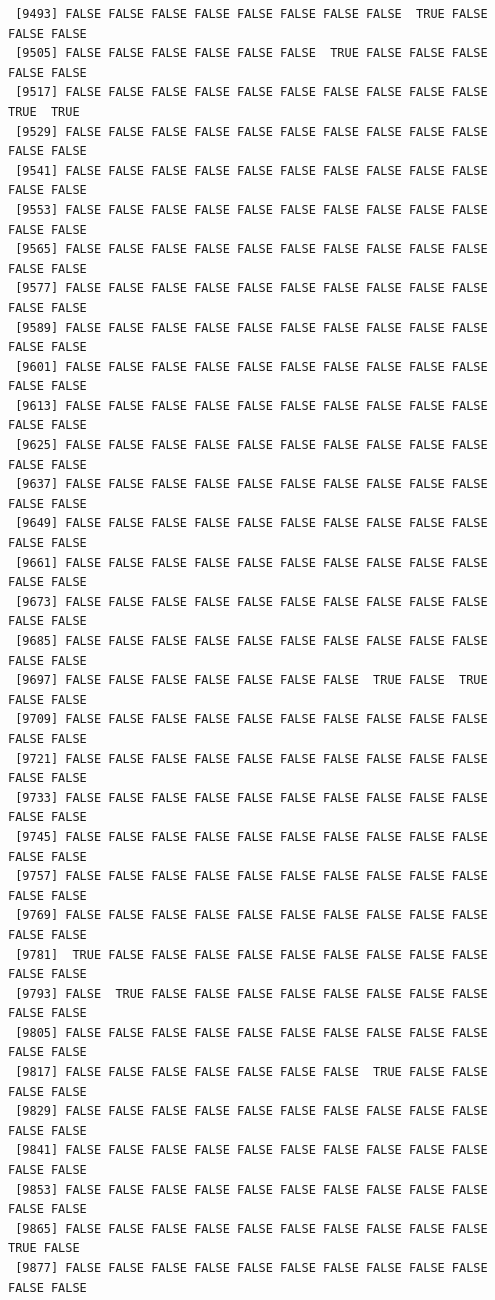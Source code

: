\documentclass[
  a4paper,
  DIV=11,
  numbers=noendperiod]{scrartcl}
\begin{document}
\begin{verbatim}
 [9493] FALSE FALSE FALSE FALSE FALSE FALSE FALSE FALSE  TRUE FALSE FALSE FALSE
 [9505] FALSE FALSE FALSE FALSE FALSE FALSE  TRUE FALSE FALSE FALSE FALSE FALSE
 [9517] FALSE FALSE FALSE FALSE FALSE FALSE FALSE FALSE FALSE FALSE  TRUE  TRUE
 [9529] FALSE FALSE FALSE FALSE FALSE FALSE FALSE FALSE FALSE FALSE FALSE FALSE
 [9541] FALSE FALSE FALSE FALSE FALSE FALSE FALSE FALSE FALSE FALSE FALSE FALSE
 [9553] FALSE FALSE FALSE FALSE FALSE FALSE FALSE FALSE FALSE FALSE FALSE FALSE
 [9565] FALSE FALSE FALSE FALSE FALSE FALSE FALSE FALSE FALSE FALSE FALSE FALSE
 [9577] FALSE FALSE FALSE FALSE FALSE FALSE FALSE FALSE FALSE FALSE FALSE FALSE
 [9589] FALSE FALSE FALSE FALSE FALSE FALSE FALSE FALSE FALSE FALSE FALSE FALSE
 [9601] FALSE FALSE FALSE FALSE FALSE FALSE FALSE FALSE FALSE FALSE FALSE FALSE
 [9613] FALSE FALSE FALSE FALSE FALSE FALSE FALSE FALSE FALSE FALSE FALSE FALSE
 [9625] FALSE FALSE FALSE FALSE FALSE FALSE FALSE FALSE FALSE FALSE FALSE FALSE
 [9637] FALSE FALSE FALSE FALSE FALSE FALSE FALSE FALSE FALSE FALSE FALSE FALSE
 [9649] FALSE FALSE FALSE FALSE FALSE FALSE FALSE FALSE FALSE FALSE FALSE FALSE
 [9661] FALSE FALSE FALSE FALSE FALSE FALSE FALSE FALSE FALSE FALSE FALSE FALSE
 [9673] FALSE FALSE FALSE FALSE FALSE FALSE FALSE FALSE FALSE FALSE FALSE FALSE
 [9685] FALSE FALSE FALSE FALSE FALSE FALSE FALSE FALSE FALSE FALSE FALSE FALSE
 [9697] FALSE FALSE FALSE FALSE FALSE FALSE FALSE  TRUE FALSE  TRUE FALSE FALSE
 [9709] FALSE FALSE FALSE FALSE FALSE FALSE FALSE FALSE FALSE FALSE FALSE FALSE
 [9721] FALSE FALSE FALSE FALSE FALSE FALSE FALSE FALSE FALSE FALSE FALSE FALSE
 [9733] FALSE FALSE FALSE FALSE FALSE FALSE FALSE FALSE FALSE FALSE FALSE FALSE
 [9745] FALSE FALSE FALSE FALSE FALSE FALSE FALSE FALSE FALSE FALSE FALSE FALSE
 [9757] FALSE FALSE FALSE FALSE FALSE FALSE FALSE FALSE FALSE FALSE FALSE FALSE
 [9769] FALSE FALSE FALSE FALSE FALSE FALSE FALSE FALSE FALSE FALSE FALSE FALSE
 [9781]  TRUE FALSE FALSE FALSE FALSE FALSE FALSE FALSE FALSE FALSE FALSE FALSE
 [9793] FALSE  TRUE FALSE FALSE FALSE FALSE FALSE FALSE FALSE FALSE FALSE FALSE
 [9805] FALSE FALSE FALSE FALSE FALSE FALSE FALSE FALSE FALSE FALSE FALSE FALSE
 [9817] FALSE FALSE FALSE FALSE FALSE FALSE FALSE  TRUE FALSE FALSE FALSE FALSE
 [9829] FALSE FALSE FALSE FALSE FALSE FALSE FALSE FALSE FALSE FALSE FALSE FALSE
 [9841] FALSE FALSE FALSE FALSE FALSE FALSE FALSE FALSE FALSE FALSE FALSE FALSE
 [9853] FALSE FALSE FALSE FALSE FALSE FALSE FALSE FALSE FALSE FALSE FALSE FALSE
 [9865] FALSE FALSE FALSE FALSE FALSE FALSE FALSE FALSE FALSE FALSE  TRUE FALSE
 [9877] FALSE FALSE FALSE FALSE FALSE FALSE FALSE FALSE FALSE FALSE FALSE FALSE

\end{verbatim}
\end{document}

